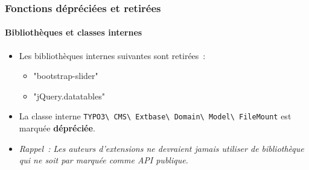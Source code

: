 \begin{frame}[fragile]
	\frametitle{Fonctions dépréciées et retirées}
	\framesubtitle{Bibliothèques et classes internes}

	\begin{itemize}
		\item Les bibliothèques internes suivantes sont retirées~:
			\begin{itemize}
				\item "bootstrap-slider"
				\item "jQuery.datatables"
			\end{itemize}
			\vspace{0.4cm}

		\item La classe interne \small\texttt{TYPO3\textbackslash
			CMS\textbackslash
			Extbase\textbackslash
			Domain\textbackslash
			Model\textbackslash
			FileMount}\normalsize\newline
			est marquée \textbf{dépréciée}.

	\end{itemize}

	\vspace{0.6cm}
	\begin{itemize}
		\item[\ding{228}] \textit{Rappel~:} \textit{Les auteurs d'extensions ne devraient jamais utiliser de bibliothèque
			qui ne soit par marquée comme API publique.}
	\end{itemize}

\end{frame}


